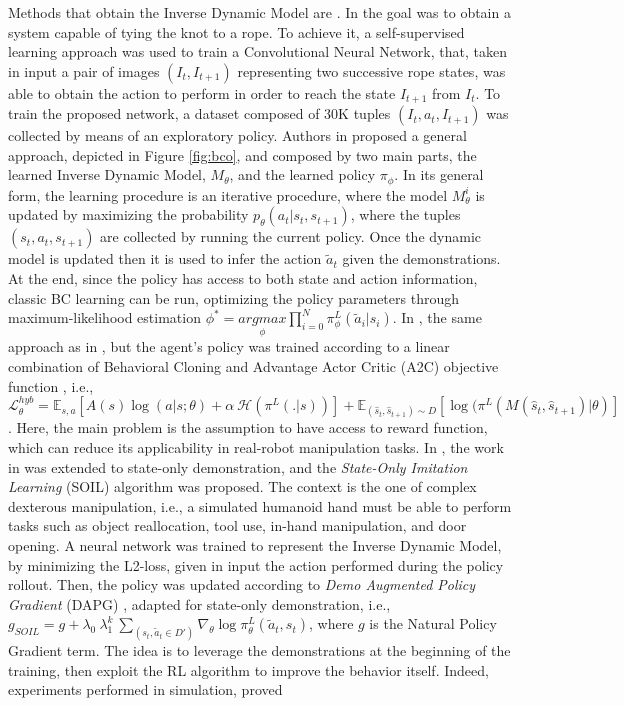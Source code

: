 \newline Methods that obtain  the Inverse Dynamic Model are \cite{nair2017combining,torabi2018bco,guo2019hybrid_rl,radosavovic2021state_only_demo}. In \cite{nair2017combining} the goal was to obtain a system capable of tying the knot to a rope. To achieve it, a self-supervised learning approach was used to train a Convolutional Neural Network, that, taken in input a pair of images $(I_{t}, I_{t+1})$ representing two successive rope states, was able to obtain the action to perform in order to reach the state $I_{t+1}$ from $I_{t}$. To train the proposed network, a dataset composed of 30K tuples $(I_{t},a_{t},I_{t+1})$ was collected by means of an exploratory policy. Authors in \cite{torabi2018bco} proposed a general approach, depicted in Figure \ref{fig:bco}, and composed by two main parts, the learned Inverse Dynamic Model, $M_{\theta}$, and the learned policy $\pi_{\phi}$. In its general form, the learning procedure is an iterative procedure, where the model $M_{\theta}^{i}$ is updated by maximizing the probability $p_{\theta}(a_{t}|s_{t},s_{t+1})$, where the tuples $(s_{t},a_{t},s_{t+1})$ are collected by running the current policy. Once the dynamic model is updated then it is used to infer the action $\tilde{a}_{t}$ given the demonstrations. At the end, since the policy has access to both state and action information, classic BC learning can be run, optimizing the policy parameters through maximum-likelihood estimation $\phi^{*} = \underset{\phi}{argmax} \prod_{i=0}^{N} \pi^{L}_{\phi}(\tilde{a}_{i}|s_{i})$. In \cite{guo2019hybrid_rl}, the same approach as in \cite{torabi2018bco}, but the agent's policy was trained according to a linear combination of Behavioral Cloning and Advantage Actor Critic (A2C) objective function \cite{mnih2016a2c}, i.e., $\mathcal{L}^{hyb}_{\theta} = \mathbb{E}_{s,a}[A(s)\log(a|s;\theta)+\alpha \ \mathcal{H}(\pi^{L}(.|s))] + \mathbb{E}_{(\hat{s}_{t},\hat{s}_{t+1})\sim D}[\log(\pi^{L}(M(\hat{s}_{t},\hat{s}_{t+1})|\theta)]$. Here, the main problem is the assumption to have access to reward function, which can reduce its applicability in real-robot manipulation tasks. In \cite{radosavovic2021state_only_demo}, the work in \cite{Rajeswaran18_learning_complex_dexterous} was extended to state-only demonstration, and the \textit{State-Only Imitation Learning} (SOIL) algorithm was proposed. The context is the one of complex dexterous manipulation, i.e., a simulated humanoid hand must be able to perform tasks such as object reallocation, tool use, in-hand manipulation, and door opening. A neural network was trained to represent the Inverse Dynamic Model, by minimizing the L2-loss, given in input the action performed during the policy rollout. Then, the policy was updated according to \textit{Demo Augmented Policy Gradient} (DAPG) \cite{Rajeswaran18_learning_complex_dexterous}, adapted for state-only demonstration, i.e., $g_{SOIL} = g + \lambda_{0} \ \lambda_{1}^{k} \ \sum_{(s_{t},\tilde{a}_{t} \in D')} \nabla_{\theta}\log\pi^{L}_{\theta}(\tilde{a}_{t},s_{t})$, where $g$ is the Natural Policy Gradient term. The idea is to leverage the demonstrations at the beginning of the training, then exploit the RL algorithm to improve the behavior itself. Indeed, experiments performed in simulation, proved 